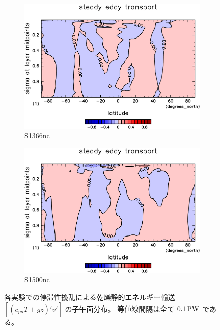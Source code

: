 \documentclass[body]{subfiles}
\begin{document}
\begin{figure}[t]
	\centering
	\begin{subfigure}{.4\textwidth}
		\centering
		\includegraphics[width=\textwidth]{S1366-nc/MeriHeatTransTest@dryStatEn_SE,time=3650:4015-crop-rotate.pdf}
		\caption{S1366nc}\label{乾燥静的エネルギー停滞性擾乱S1366nc}
	\end{subfigure}
	\begin{subfigure}{.4\textwidth}
		\centering
		\includegraphics[width=\textwidth]{S1500-nc/MeriHeatTransTest@dryStatEn_SE,time=3650:4015-crop-rotate.pdf}
		\caption{S1500nc}\label{乾燥静的エネルギー停滞性擾乱S1500nc}
	\end{subfigure}
	\caption[各実験でのに停滞性擾乱依る乾燥静的エネルギー輸送の子午面分布]{
		各実験での停滞性擾乱による乾燥静的エネルギー輸送 \([\overline{(c_{pn}T+gz)'v'}]\) の子午面分布。
		等値線間隔は全て \(0.1\hmu{PW}\) である。
	}\label{乾燥静的エネルギー停滞性擾乱nc}
\end{figure}
\end{document}
